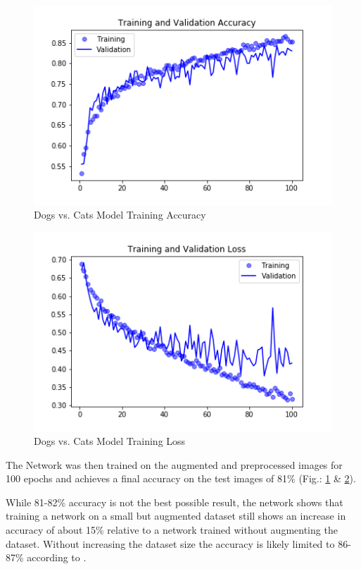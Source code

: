 \documentclass[sigconf, nonacm]{acmart}
\begin{document}
\begin{figure}[h]
  \centering
  \includegraphics[width=\linewidth]{convnetFromScratch_Accuracy}
  \caption{Dogs vs. Cats Model Training Accuracy}
  \label{fig:CvDAcc}
\end{figure}

\begin{figure}[h]
  \centering
  \includegraphics[width=\linewidth]{convnetFromScratch_Loss}
  \caption{Dogs vs. Cats Model Training Loss}
  \label{fig:CvDLoss}
\end{figure}

The Network was then trained on the augmented and preprocessed images for 100 epochs and achieves a final accuracy on the test images of 81\% (Fig.: \ref{fig:CvDAcc} \& \ref{fig:CvDLoss}).

While 81-82\% accuracy is not the best possible result, the network shows that training a network on a small but augmented dataset still shows an increase in accuracy of about 15\% relative to a network trained without augmenting the dataset.
Without increasing the dataset size the accuracy is likely limited to 86-87\% according to \cite{DLwP}.
\end{document}
